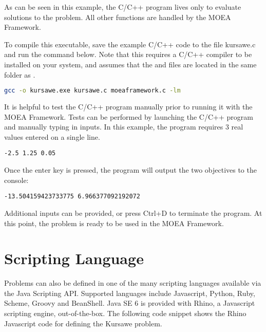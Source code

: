As can be seen in this example, the C/C++ program lives only to evaluate solutions to the problem.  All other functions are handled by the MOEA Framework.

To compile this executable, save the example C/C++ code to the file kursawe.c and run the command below.  Note that this requires a C/C++ compiler to be installed on your system, and assumes that the  and  files are located in the same folder as .

\begin{lstlisting}[language=bash]
gcc -o kursawe.exe kursawe.c moeaframework.c -lm
\end{lstlisting}

It is helpful to test the C/C++ program manually prior to running it with the MOEA Framework.  Tests can be performed by launching the C/C++ program and manually typing in inputs.  In this example, the program requires 3 real values entered on a single line.

\begin{lstlisting}[language=Plaintext]
-2.5 1.25 0.05
\end{lstlisting}

Once the enter key is pressed, the program will output the two objectives to the console:

\begin{lstlisting}[language=Plaintext]
-13.504159423733775 6.966377092192072
\end{lstlisting}

Additional inputs can be provided, or press Ctrl+D to terminate the program.  At this point, the problem is ready to be used in the MOEA Framework.

\section{Scripting Language}
Problems can also be defined in one of the many scripting languages available via the Java Scripting API.  Supported languages include Javascript, Python, Ruby, Scheme, Groovy and BeanShell.  Java SE 6 is provided with Rhino, a Javascript scripting engine, out-of-the-box.  The following code snippet shows the Rhino Javascript code for defining the Kursawe problem.

